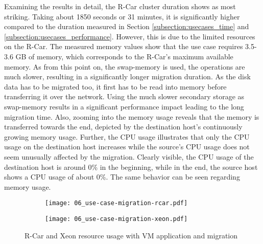             
            \noindent Examining the results in detail, the R-Car cluster duration shows as most striking.
            Taking about 1850 seconds or 31 minutes, it is significantly higher compared to the duration measured in Section \ref{subsection:usecases_time} and \ref{subsection:usecases_performance}.
            However, this is due to the limited resources on the R-Car.
            The measured memory values show that the use case requires 3.5-3.6 GB of memory, which corresponds to the R-Car's maximum available memory.
            As from this point on, the swap-memory is used, the operations are much slower, resulting in a significantly longer migration duration.
            As the disk data has to be migrated too, it first has to be read into memory before transferring it over the network.
            Using the much slower secondary storage as swap-memory results in a significant performance impact leading to the long migration time.
            Also, zooming into the memory usage reveals that the memory is transferred towards the end, depicted by the destination host's continuously growing memory usage.
            Further, the CPU usage illustrates that only the CPU usage on the destination host increases while the source’s CPU usage does not seem unusually affected by the migration.
            Clearly visible, the \ac{CPU} usage of the destination host is around 0\% in the beginning, while in the end, the source host shows a \ac{CPU} usage of about 0\%.
            The same behavior can be seen regarding memory usage.
            
            \begin{figure}[H]
                \centering
                \begin{subfigure}[b]{0.93\textwidth}
                    \centering
                    \texttt{[image: 06\_use-case-migration-rcar.pdf]}
                \end{subfigure}
                \begin{subfigure}[b]{0.93\textwidth}
                    \centering
                    \texttt{[image: 06\_use-case-migration-xeon.pdf]}
                \end{subfigure}
                \caption{R-Car and Xeon resource usage with VM application and migration}
                \label{figure:use_case_migration}
            \end{figure}
            
